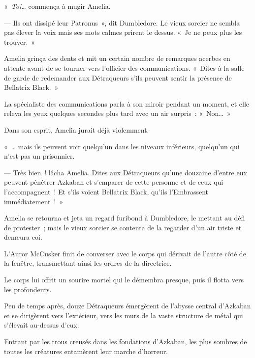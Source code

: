 «~\emph{Toi…} commença à mugir Amelia.

--- Ils ont dissipé leur Patronus~», dit Dumbledore. Le vieux sorcier ne sembla pas élever la voix mais ses mots calmes prirent le dessus. «~Je ne peux plus les trouver.~»

Amelia grinça des dents et mit un certain nombre de remarques acerbes en attente avant de se tourner vers l'officier des communications. «~Dites à la salle de garde de redemander aux Détraqueurs s'ils peuvent sentir la présence de Bellatrix Black.~»

La spécialiste des communications parla à son miroir pendant un moment, et elle releva les yeux quelques secondes plus tard avec un air surpris~: «~Non…~»

Dans son esprit, Amelia jurait déjà violemment.

«~… mais ils peuvent voir quelqu'un dans les niveaux inférieurs, quelqu'un qui n'est pas un prisonnier.

--- Très bien~! lâcha Amelia. Dites aux Détraqueurs qu'une douzaine d'entre eux peuvent pénétrer Azkaban et s'emparer de cette personne et de ceux qui l'accompagnent~! Et s'ils voient Bellatrix Black, qu'ils l'Embrassent immédiatement~!~»

Amelia se retourna et jeta un regard furibond à Dumbledore, le mettant au défi de protester~; mais le vieux sorcier se contenta de la regarder d'un air triste et demeura coi.

\later

L'Auror McCusker finit de converser avec le corps qui dérivait de l'autre côté de la fenêtre, transmettant ainsi les ordres de la directrice.

Le corps lui offrit un sourire mortel qui le démembra presque, puis il flotta vers les profondeurs.

Peu de temps après, douze Détraqueurs émergèrent de l'abysse central d'Azkaban et se dirigèrent vers l'extérieur, vers les murs de la vaste structure de métal qui s'élevait au-dessus d'eux.

Entrant par les trous creusés dans les fondations d'Azkaban, les plus sombres de toutes les créatures entamèrent leur marche d'horreur.
